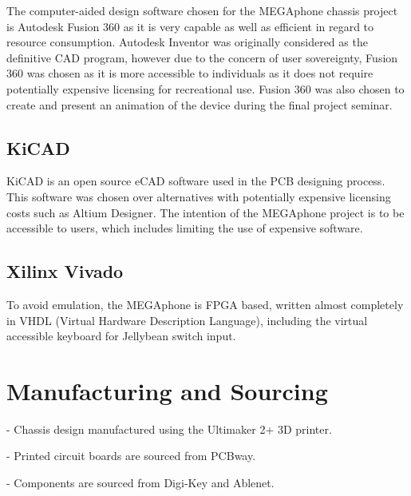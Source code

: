 The computer-aided design software chosen for the MEGAphone chassis project is Autodesk Fusion 360 as it is very capable as well as efficient in regard to resource consumption. 
Autodesk Inventor was originally considered as the definitive CAD program, however due to the concern of user sovereignty, Fusion 360 was chosen as it is more accessible to individuals as it does not require potentially expensive licensing for recreational use. 
Fusion 360 was also chosen to create and present an animation of the device during the final project seminar.


\subsection{KiCAD}

KiCAD is an open source eCAD software used in the PCB designing process. 
This software was  chosen over alternatives with potentially expensive licensing costs such as Altium Designer. 
The intention of the MEGAphone project is to be accessible to users, which includes limiting the use of expensive software.


\subsection{Xilinx Vivado}

To avoid emulation, the MEGAphone is FPGA based, written almost completely in VHDL (Virtual Hardware Description Language), including the virtual accessible keyboard for Jellybean switch input.


\section{Manufacturing and Sourcing}

    -   Chassis design manufactured using the Ultimaker 2+ 3D printer.

-   Printed circuit boards are sourced from PCBway.

-   Components are sourced from Digi-Key and Ablenet.


